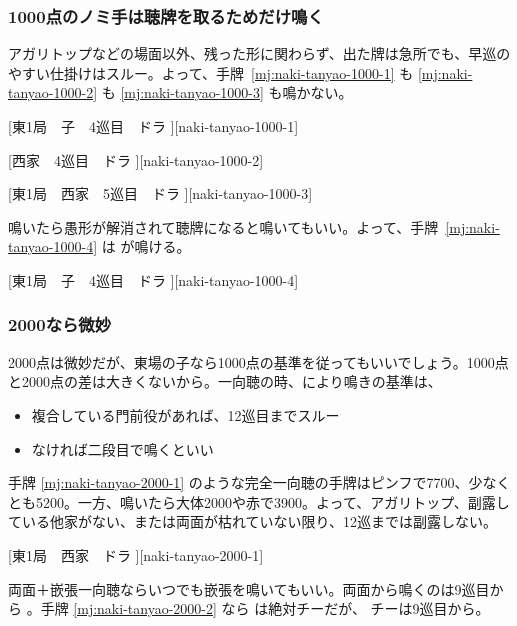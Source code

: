 \documentclass[../nankiru_main.tex]{subfiles}
\begin{document}
\subsubsection*{1000点のノミ手は聴牌を取るためだけ鳴く}

アガリトップなどの場面以外、残った形に関わらず、出た牌は急所でも、早巡のやすい仕掛けはスルー。よって、手牌~\ref{mj:naki-tanyao-1000-1} も \ref{mj:naki-tanyao-1000-2} も \ref{mj:naki-tanyao-1000-3} も鳴かない。

[東1局　子　4巡目　ドラ ][naki-tanyao-1000-1]

[西家　4巡目　ドラ ][naki-tanyao-1000-2]

[東1局　西家　5巡目　ドラ ][naki-tanyao-1000-3]

鳴いたら愚形が解消されて聴牌になると鳴いてもいい。よって、手牌~\ref{mj:naki-tanyao-1000-4} は  が鳴ける\citep{yoteru-badnaki}。

[東1局　子　4巡目　ドラ ][naki-tanyao-1000-4]


\subsubsection*{2000なら微妙}

2000点は微妙だが、東場の子なら1000点の基準を従ってもいいでしょう\citep[][p.~179]{tetsusenryaku}。1000点と2000点の差は大きくないから。一向聴の時、\citet[][p.~33, p.~38]{hirasawa-naki}により鳴きの基準は、

\begin{itemize}
\item 複合している門前役があれば、12巡目までスルー
\item なければ二段目で鳴くといい
\end{itemize}

手牌 \ref{mj:naki-tanyao-2000-1} のような完全一向聴の手牌はピンフで7700、少なくとも5200。一方、鳴いたら大体2000や赤で3900。よって、アガリトップ、副露している他家がない、または両面が枯れていない限り、12巡までは副露しない。

[東1局　西家　ドラ ][naki-tanyao-2000-1]

両面＋嵌張一向聴ならいつでも嵌張を鳴いてもいい。両面から鳴くのは9巡目から \citep[][p.~40]{hirasawa-naki}。手牌 \ref{mj:naki-tanyao-2000-2} なら  は絶対チーだが、 チーは9巡目から。
\end{document}
